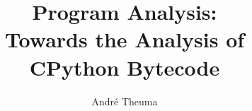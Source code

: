 \documentclass[oneside]{um-fict}  %
\title{Program Analysis:\\Towards the Analysis of\\CPython Bytecode}  %
\author{André Theuma}            %
\begin{document}
\frontmatter 
    \maketitle
    \if@openright\cleardoublepage\else\clearpage\fi
    \tableofcontents*\if@openright\cleardoublepage\else\clearpage\fi
    \listoffigures\if@openright\cleardoublepage\else\clearpage\fi
    \listoftables\if@openright\cleardoublepage\else\clearpage\fi
    \if@openright\cleardoublepage\else\clearpage\fi

\mainmatter 
     
    
    
    
    
    

{%
    \if@openright\cleardoublepage\else\clearpage\fi
    
    {\scriptsize}
	\printindex
}

\appendix
\end{document}

